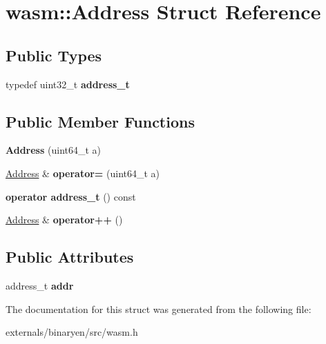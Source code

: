 \hypertarget{structwasm_1_1_address}{}\section{wasm\+:\+:Address Struct Reference}
\label{structwasm_1_1_address}
\subsection*{Public Types}
\begin{DoxyCompactItemize}
\item 
\mbox{\label{structwasm_1_1_address_afa48df3f2e571c2b708e9e6737b8c7d9}} 
typedef uint32\+\_\+t {\bfseries address\+\_\+t}
\end{DoxyCompactItemize}
\subsection*{Public Member Functions}
\begin{DoxyCompactItemize}
\item 
\mbox{\label{structwasm_1_1_address_ad5a2b126b94f14d2e771d008116dbf21}} 
{\bfseries Address} (uint64\+\_\+t a)
\item 
\mbox{\label{structwasm_1_1_address_aac5fe58fc59029562ba37651aaf61346}} 
\mbox{\hyperlink{structwasm_1_1_address}{Address}} \& {\bfseries operator=} (uint64\+\_\+t a)
\item 
\mbox{\label{structwasm_1_1_address_a16e3c9a5b59a6ea3a4e5d833632dc74d}} 
{\bfseries operator address\+\_\+t} () const
\item 
\mbox{\label{structwasm_1_1_address_aceab8ca4b5970549aede9d85c1e772cb}} 
\mbox{\hyperlink{structwasm_1_1_address}{Address}} \& {\bfseries operator++} ()
\end{DoxyCompactItemize}
\subsection*{Public Attributes}
\begin{DoxyCompactItemize}
\item 
\mbox{\label{structwasm_1_1_address_a69ffd0ace6e04207a5e08e8d6d196b00}} 
address\+\_\+t {\bfseries addr}
\end{DoxyCompactItemize}


The documentation for this struct was generated from the following file\+:\begin{DoxyCompactItemize}
\item 
externals/binaryen/src/wasm.\+h\end{DoxyCompactItemize}
